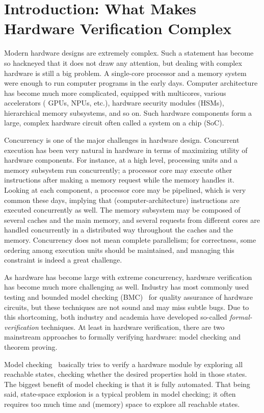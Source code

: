 \chapter{Introduction: What Makes Hardware Verification Complex}

Modern hardware designs are extremely complex.
Such a statement has become so hackneyed that it does not draw any attention, but dealing with complex hardware is still a big problem.
A single-core processor and a memory system were enough to run computer programs in the early days.
Computer architecture has become much more complicated, equipped with multicores, various accelerators (\eg{} GPUs, NPUs, etc.), hardware security modules (HSMs), hierarchical memory subsystems, and so on.
Such hardware components form a large, complex hardware circuit often called a system on a chip (SoC).

Concurrency is one of the major challenges in hardware design.
Concurrent execution has been very natural in hardware in terms of maximizing utility of hardware components.
For instance, at a high level, processing units and a memory subsystem run concurrently; \eg{} a processor core may execute other instructions after making a memory request while the memory handles it.
Looking at each component, a processor core may be pipelined, which is very common these days, implying that (computer-architecture) instructions are executed concurrently as well.
The memory subsystem may be composed of several caches and the main memory, and several requests from different cores are handled concurrently in a distributed way throughout the caches and the memory.
Concurrency does not mean complete parallelism; for correctness, some ordering among execution units should be maintained, and managing this constraint is indeed a great challenge.

As hardware has become large with extreme concurrency, hardware verification has become much more challenging as well.
Industry has most commonly used testing and bounded model checking (BMC)~\cite{BMC} for quality assurance of hardware circuits, but these techniques are not sound and may miss subtle bugs.
Due to this shortcoming, both industry and academia have developed so-called \emph{formal-verification} techniques.
At least in hardware verification, there are two mainstream approaches to formally verifying hardware: model checking and theorem proving.

Model checking~\cite{ModelChecking1, ModelChecking2} basically tries to verify a hardware module by exploring all reachable states, checking whether the desired properties hold in those states.
The biggest benefit of model checking is that it is fully automated.
That being said, state-space explosion is a typical problem in model checking; it often requires too much time and (memory) space to explore all reachable states.

